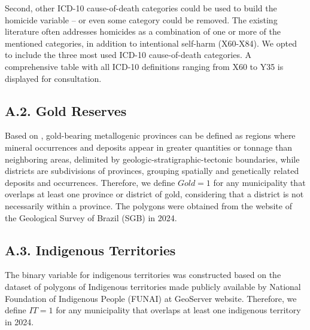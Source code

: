 \documentclass[preprint,12pt]{elsarticle}
\renewcommand{\arraystretch}{1.2}
\begin{document}
Second, other ICD-10 cause-of-death categories could be used to build the homicide variable -- or even some category could be removed. The existing literature often addresses homicides as a combination of one or more of the mentioned categories, in addition to intentional self-harm (X60-X84). We opted to include the three most used ICD-10 cause-of-death categories. A comprehensive table with all ICD-10 definitions ranging from X60 to Y35 is displayed for consultation.

\begingroup
\small
\renewcommand{\arraystretch}{1.2}
\setlength{\tabcolsep}{3.5pt}

\endgroup

\subsection*{A.2. Gold Reserves}

Based on \citet{sgb2024}, gold-bearing metallogenic provinces can be defined as regions where mineral occurrences and deposits appear in greater quantities or tonnage than neighboring areas, delimited by geologic-stratigraphic-tectonic boundaries, while districts are subdivisions of provinces, grouping spatially and genetically related deposits and occurrences. Therefore, we define \(Gold = 1\) for any municipality that overlaps at least one province or district of gold, considering that a district is not necessarily within a province. The polygons were obtained from the website of the Geological Survey of Brazil (SGB) in 2024.

\subsection*{A.3. Indigenous Territories}

The binary variable for indigenous territories was constructed based on the dataset of polygons of Indigenous territories made publicly available by National Foundation of Indigenous People (FUNAI) at GeoServer website. Therefore, we define \(IT = 1\) for any municipality that overlaps at least one indigenous territory in 2024.



\end{document}
